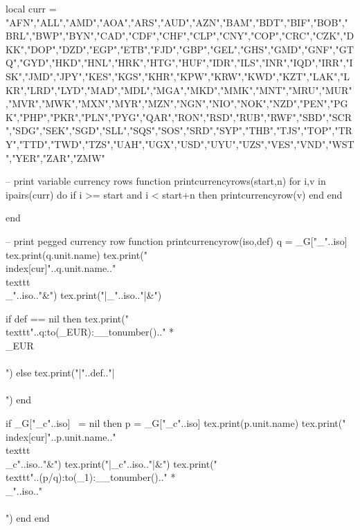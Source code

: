 \documentclass{ltxdoc}
\newcommand\thead[1]{#1}
\begin{document}
\begin{luacode}
local curr = {"AFN","ALL","AMD","AOA","ARS","AUD","AZN","BAM","BDT","BIF","BOB","BRL","BWP","BYN","CAD","CDF","CHF","CLP","CNY","COP","CRC","CZK","DKK","DOP","DZD","EGP","ETB","FJD","GBP","GEL","GHS","GMD","GNF","GTQ","GYD","HKD","HNL","HRK","HTG","HUF","IDR","ILS","INR","IQD","IRR","ISK","JMD","JPY","KES","KGS","KHR","KPW","KRW","KWD","KZT","LAK","LKR","LRD","LYD","MAD","MDL","MGA","MKD","MMK","MNT","MRU","MUR","MVR","MWK","MXN","MYR","MZN","NGN","NIO","NOK","NZD","PEN","PGK","PHP","PKR","PLN","PYG","QAR","RON","RSD","RUB","RWF","SBD","SCR","SDG","SEK","SGD","SLL","SQS","SOS","SRD","SYP","THB","TJS","TOP","TRY","TTD","TWD","TZS","UAH","UGX","USD","UYU","UZS","VES","VND","WST","YER","ZAR","ZMW"}

-- print variable currency rows
function printcurrencyrows(start,n)
  for i,v in ipairs(curr) do
    if i >= start and i < start+n  then
      printcurrencyrow(v)
    end
  end

end

-- print pegged currency row
function printcurrencyrow(iso,def)
    q = _G["_"..iso]
    tex.print(q.unit.name)
    tex.print("\\index[cur]{"..q.unit.name.." \\texttt{\\_"..iso.."}}&")
    tex.print("|_"..iso.."|&")

    if def == nil then
      tex.print("\\texttt{"..q:to(_EUR):__tonumber().." * \\_EUR} \\\\")
    else
      tex.print("|"..def.."|\\\\")
    end

    if _G["_c"..iso] ~= nil then
      p = _G["_c"..iso]
      tex.print(p.unit.name)
      tex.print("\\index[cur]{"..p.unit.name.." \\texttt{\\_c"..iso.."}}&")
      tex.print("|_c"..iso.."|&")
      tex.print("\\texttt{"..(p/q):to(_1):__tonumber().." * \\_"..iso.."} \\\\")
    end
end
\end{luacode}


\newcommand{\currencytable}[1]{%
  \begin{table}[H]
  \centering
  \begin{tabularx}{\linewidth}{%
    >{\setlength\hsize{1\hsize}}X%
    l%
    >{\setlength\hsize{1\hsize}}X%
  }

  \thead{Name} & \thead{Symbol} & \thead{Definition} \\\hline

  #1

  \hline

  \end{tabularx}
  \end{table}
}
\end{document}
